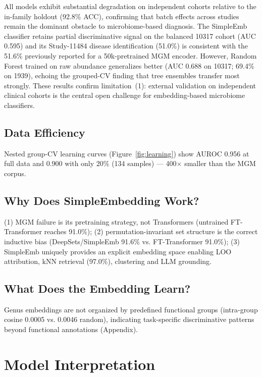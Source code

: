 \documentclass{article} %
\begin{document}
All models exhibit substantial degradation on independent cohorts relative to the in-family holdout (92.8\% ACC), confirming that batch effects across studies remain the dominant obstacle to microbiome-based diagnosis. The SimpleEmb classifier retains partial discriminative signal on the balanced 10317 cohort (AUC 0.595) and its Study-11484 disease identification (51.0\%) is consistent with the 51.6\% previously reported for a 50k-pretrained MGM encoder. However, Random Forest trained on raw abundance generalizes better (AUC 0.688 on 10317; 69.4\% on 1939), echoing the grouped-CV finding that tree ensembles transfer most strongly. These results confirm limitation~(1): external validation on independent clinical cohorts is the central open challenge for embedding-based microbiome classifiers.

\subsection{Data Efficiency}

Nested group-CV learning curves (Figure~\ref{fig:learning}) show AUROC 0.956 at full data and 0.900 with only 20\% (134 samples) --- 400$\times$ smaller than the MGM corpus.

\subsection{Why Does SimpleEmbedding Work?}

(1) MGM failure is its pretraining strategy, not Transformers (untrained FT-Transformer reaches 91.0\%); (2) permutation-invariant set structure is the correct inductive bias (DeepSets/SimpleEmb 91.6\% vs. FT-Transformer 91.0\%); (3) SimpleEmb uniquely provides an explicit embedding space enabling LOO attribution, kNN retrieval (97.0\%), clustering and LLM grounding.

\subsection{What Does the Embedding Learn?}

Genus embeddings are not organized by predefined functional groups (intra-group cosine 0.0005 vs. 0.0046 random), indicating task-specific discriminative patterns beyond functional annotations (Appendix).

\section{Model Interpretation}
\end{document}
